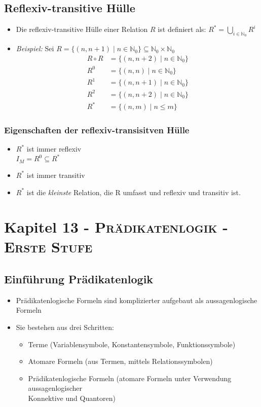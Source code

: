\documentclass{article}
\newcommand{\Nz}{{\mathbb{N}_0}} %
\newcommand{\kapitel}[2]{Kapitel #1 - \textsc{#2}}
\newcommand{\important}[1]{\textcolor{importantColor}{#1}}
\newcommand{\example}[1]{\textit{Beispiel: }#1}
\newcommand{\set}[1]{\{#1\}}
\begin{document}
\subsection{Reflexiv-transitive Hülle}
\begin{itemize}
    
    \item Die \important{reflexiv-transitive Hülle} einer Relation $R$ ist definiert als: $R^*=\displaystyle{\bigcup_{i\in \Nz}}R^i$
    \item \example{Sei $R=\set{(n, n+1)\mid n\in\Nz}\subseteq\Nz\times\Nz$}
    \begin{align*}
        R\circ R &= \set{(n, n+2)\mid n\in\Nz}\\
        R^0 &= \set{(n,n)\mid n\in\Nz}\\
        R^1 &= \set{(n,n+1)\mid n\in\Nz}\\
        R^2 &= \set{(n,n+2)\mid n\in\Nz}\\
        R^* &= \set{(n,m)\mid n\leq m}
    \end{align*}
\end{itemize}
\subsubsection{Eigenschaften der reflexiv-transisitven Hülle}
\begin{itemize}
    \item $R^*$ ist immer reflexiv\\
    $I_M = R^0\subseteq R^*$
    \item $R^*$ ist immer transitiv
    \item $R^*$ ist die \textit{kleinste} Relation, die R umfasst und reflexiv und transitiv ist.
\end{itemize}

\newpage
\section{\kapitel{13}{Prädikatenlogik - Erste Stufe}}
\subsection{Einführung Prädikatenlogik}
\begin{itemize}
    \item Prädikatenlogische Formeln sind komplizierter aufgebaut als aussagenlogische Formeln
    \item Sie bestehen aus drei Schritten:
    \begin{itemize}
        \item \important{Terme} (Variablensymbole, Konstantensymbole, Funktionssymbole)
        \item \important{Atomare Formeln} (aus Termen, mittels Relationssymbolen)
        \item \important{Prädikatenlogische Formeln} (atomare Formeln unter Verwendung aussagenlogischer \\Konnektive und Quantoren)
    \end{itemize}
\end{itemize}
\end{document}
